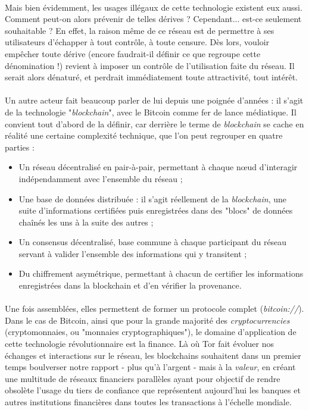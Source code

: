 \paragraph{} Mais bien évidemment, les usages illégaux de cette technologie existent eux aussi. Comment peut-on alors 
prévenir de telles dérives ? Cependant... est-ce seulement souhaitable ? En effet, la raison même de ce réseau est de
permettre à ses utilisateurs d'échapper à tout contrôle, à toute censure. Dès lors, vouloir empêcher toute dérive (encore
faudrait-il définir ce que regroupe cette dénomination !) revient à imposer un contrôle de l'utilisation faite du réseau.
Il serait alors dénaturé, et perdrait immédiatement toute attractivité, tout intérêt.

\paragraph{} Un autre acteur fait beaucoup parler de lui depuis une poignée d'années : il s'agit de la technologie 
"\emph{blockchain}", avec le Bitcoin comme fer de lance médiatique. Il convient tout d'abord de la définir, car derrière 
le terme de \emph{blockchain} se cache en réalité une certaine complexité technique, que l'on peut regrouper en quatre parties :

\begin{itemize}
    \item Un réseau décentralisé en pair-à-pair, permettant à chaque n\oe{}ud d'interagir indépendamment avec l'ensemble 
    du réseau ;
    \item Une base de données distribuée : il s'agit réellement de la \emph{blockchain}, une suite d'informations certifiées
    puis enregistrées dans des "blocs" de données chaînés les uns à la suite des autres ;
    \item Un consensus décentralisé, base commune à chaque participant du réseau servant à valider l'ensemble des informations
    qui y transitent ;
    \item Du chiffrement asymétrique, permettant à chacun de certifier les informations enregistrées dans la
    blockchain et d'en vérifier la provenance.
\end{itemize}

\paragraph{} Une fois assemblées, elles permettent de former un protocole complet (\emph{bitcoin://}). Dans le cas de Bitcoin,
ainsi que pour la grande majorité des \emph{cryptocurrencies} (cryptomonnaies, ou "monnaies cryptographiques"), le domaine d'application
de cette technologie révolutionnaire est la finance. Là où Tor fait évoluer nos échanges et interactions sur le réseau, 
les blockchains souhaitent dans un premier temps boulverser notre rapport - plus qu'à l'argent - mais à la \emph{valeur}, 
en créant une multitude de réseaux financiers parallèles ayant pour objectif de rendre obsolète l'usage du tiers de confiance
que représentent aujourd'hui les banques et autres institutions financières dans toutes les transactions à l'échelle mondiale.

